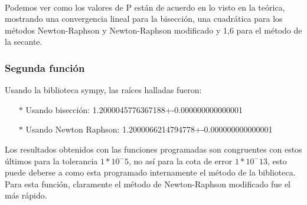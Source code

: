 \documentclass[titlepage,a4paper]{article}
\begin{document}
\\Podemos ver como los valores de P están de acuerdo en lo visto en la teórica, mostrando una convergencia lineal para la bisección, una cuadrática para los métodos Newton-Raphson y Newton-Raphson modificado y 1,6 para el método de la secante.
\subsubsection{Segunda función}\label{sec:CR2}

Usando la biblioteca sympy, las raíces halladas fueron:
\begin{itemize}
    \item[$*$]Usando bisección:   1.2000045776367188+-0.000000000000001
    \item[$*$]Usando Newton Raphson:  1.2000066214794778+-0.000000000000001
\end{itemize}

Los resultados obtenidos con las funciones programadas son congruentes con estos últimos para la tolerancia $1*10^-5$, no así para la cota de error $1*10^-13$, esto puede deberse a como esta programado internamente el método de la biblioteca. Para esta función, claramente el método de Newton-Raphson modificado fue el más rápido. 
\end{document}
